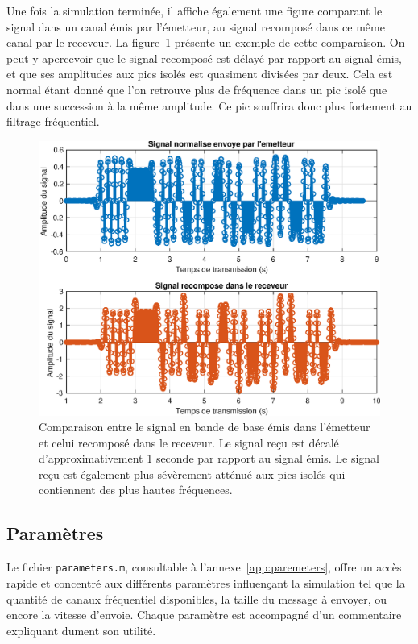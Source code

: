 \documentclass[10pt, oneside, a4paper]{article}
\begin{document}
Une fois la simulation terminée, il affiche également une figure comparant le signal dans un canal émis par l'émetteur, au signal recomposé dans ce même canal par le receveur.
La figure~\ref{fig:comparaison} présente un exemple de cette comparaison.
On peut y apercevoir que le signal recomposé est délayé par rapport au signal émis, et que ses amplitudes aux pics isolés est quasiment divisées par deux.
Cela est normal étant donné que l'on retrouve plus de fréquence dans un pic isolé que dans une succession à la même amplitude.
Ce pic souffrira donc plus fortement au filtrage fréquentiel.

\begin{figure}[p]
    \centering
    \includegraphics[height=0.45\textheight]{eps/comparaison.eps}
    \caption{Comparaison entre le signal en bande de base émis dans l'émetteur et celui
             recomposé dans le receveur.
             Le signal reçu est décalé d'approximativement 1 seconde par rapport au signal
             émis.
             Le signal reçu est également plus sévèrement atténué aux pics isolés qui
             contiennent des plus hautes fréquences.}
    \label{fig:comparaison}
\end{figure}

\subsection{Paramètres}
Le fichier \texttt{parameters.m}, consultable à l'annexe~\ref{app:paremeters}, offre un accès rapide et concentré aux différents paramètres influençant la simulation tel que la quantité de canaux fréquentiel disponibles, la taille du message à envoyer, ou encore la vitesse d'envoie.
Chaque paramètre est accompagné d'un commentaire expliquant dument son utilité.
\end{document}
